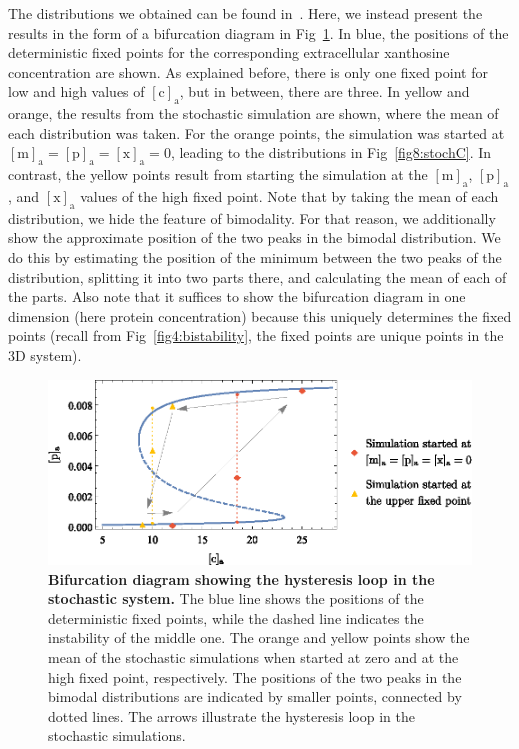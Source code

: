\documentclass[10pt,letterpaper]{article}
\begin{document}
	The distributions we obtained can be found in~. Here, we instead present the results in the form of a bifurcation diagram in Fig~\ref{fig10:Bifurcation}. In blue, the positions of the deterministic fixed points for the corresponding extracellular xanthosine concentration are shown. As explained before, there is only one fixed point for low and high values of $\mathrm{[c]_a}$, but in between, there are three. In yellow and orange, the results from the stochastic simulation are shown, where the mean of each distribution was taken. For the orange points, the simulation was started at $\mathrm{[m]_a}=\mathrm{[p]_a}=\mathrm{[x]_a}=0$, leading to the distributions in Fig~\ref{fig8:stochC}. In contrast, the yellow points result from starting the simulation at the $\mathrm{[m]_a}$, $\mathrm{[p]_a}$, and $\mathrm{[x]_a}$ values of the high fixed point. Note that by taking the mean of each distribution, we hide the feature of bimodality. For that reason, we additionally show the approximate position of the two peaks in the bimodal distribution. We do this by estimating the position of the minimum between the two peaks of the distribution, splitting it into two parts there, and calculating the mean of each of the parts. Also note that it suffices to show the bifurcation diagram in one dimension (here protein concentration) because this uniquely determines the fixed points (recall from Fig~\ref{fig4:bistability}, the fixed points are unique points in the 3D system).
	
	\begin{figure}%
		\centering
		\includegraphics{media/Fig10_bifurcation.eps}
		\caption{{\bf Bifurcation diagram showing the hysteresis loop in the stochastic system.}
			The blue line shows the positions of the deterministic fixed
			points, while the dashed line indicates the instability of
			the middle one. The orange and yellow points show the mean
			of the stochastic simulations when started at zero and at
			the high fixed point, respectively. The positions of the two
			peaks in the bimodal distributions are indicated by smaller
			points, connected by dotted lines. The arrows illustrate the
			hysteresis loop in the stochastic simulations.
			}
		\label{fig10:Bifurcation}
	\end{figure}
		
\end{document}
